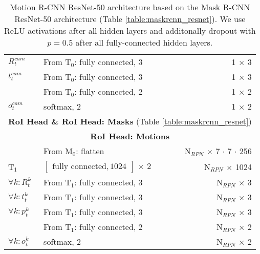 {\begin{table}[h]
\begin{tabular}{llr}
$R_t^{cam}$& From T$_0$: fully connected, 3 & 1 $\times$ 3 \\
$t_t^{cam}$& From T$_0$: fully connected, 3 & 1 $\times$ 3 \\
& From T$_0$: fully connected, 2 & 1 $\times$ 2 \\
$o_t^{cam}$& softmax, 2 & 1 $\times$ 2 \\
\midrule
\multicolumn{3}{c}{\textbf{RoI Head \& RoI Head: Masks} (Table \ref{table:maskrcnn_resnet})}\\
\midrule
\multicolumn{3}{c}{\textbf{RoI Head: Motions}}\\
\midrule
& From M$_0$: flatten & N$_{RPN}$ $\times$ 7 $\cdot$ 7 $\cdot$ 256 \\
T$_1$ & $\begin{bmatrix}\textrm{fully connected}, 1024\end{bmatrix}$ $\times$ 2 & N$_{RPN}$ $\times$ 1024 \\
$\forall k: R_t^k$ & From T$_1$: fully connected, 3 & N$_{RPN}$ $\times$ 3 \\
$\forall k: t_t^k$ & From T$_1$: fully connected, 3 & N$_{RPN}$ $\times$ 3 \\
$\forall k: p_t^k$ & From T$_1$: fully connected, 3 & N$_{RPN}$ $\times$ 3 \\
& From T$_1$: fully connected, 2 & N$_{RPN}$ $\times$ 2 \\
$\forall k: o_t^k$ & softmax, 2 & N$_{RPN}$ $\times$ 2 \\

\bottomrule
\end{tabular}

\caption {
Motion R-CNN ResNet-50 architecture based on the Mask R-CNN
ResNet-50 architecture (Table \ref{table:maskrcnn_resnet}).
We use ReLU activations after all hidden layers and
additonally dropout with $p = 0.5$ after all fully-connected hidden layers.
}
\label{table:motionrcnn_resnet}
\end{table}
}

